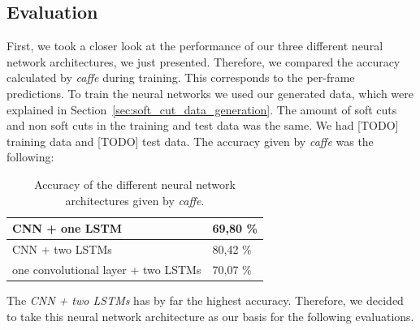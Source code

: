 \subsection{Evaluation}
\label{sec:soft_cut_evaluation}

First, we took a closer look at the performance of our three different neural network architectures, we just presented.
Therefore, we compared the accuracy calculated by \textit{caffe} during training.
This corresponds to the per-frame predictions.
To train the neural networks we used our generated data, which were explained in Section~\ref{sec:soft_cut_data_generation}.
The amount of soft cuts and non soft cuts in the training and test data was the same.
We had [TODO] training data and [TODO] test data.
The accuracy given by \textit{caffe} was the following:
\begin{table}[ht]
	\centering
	\begin{tabular}{l|l}
	CNN + one LSTM                      & 69,80 \% \\ \hline
	CNN + two LSTMs                     & 80,42 \% \\ \hline
	one convolutional layer + two LSTMs & 70,07 \% \\
	\end{tabular}
	\caption{Accuracy of the different neural network architectures given by \textit{caffe}.}
	\label{tab:caffe_accurary}
\end{table}
The \textit{CNN + two LSTMs} has by far the highest accuracy.
Therefore, we decided to take this neural network architecture as our basis for the following evaluations.

